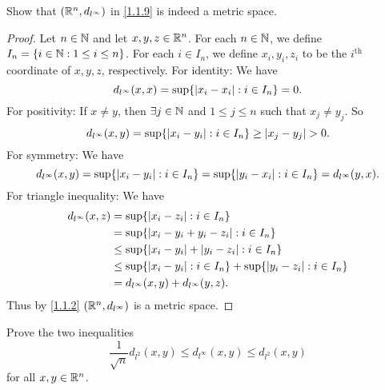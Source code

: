 \begin{ex}\label{ex:1.1.9}
  Show that \((\mathbb{R}^n, d_{l^\infty})\) in \cref{1.1.9} is indeed a metric space.
\end{ex}

\begin{proof}
  Let \(n \in \mathbb{N}\) and let \(x, y, z \in \mathbb{R}^n\).
  For each \(n \in \mathbb{N}\), we define \(I_n = \{i \in \mathbb{N} : 1 \leq i \leq n\}\).
  For each \(i \in I_n\), we define \(x_i, y_i, z_i\) to be the \(i^{\text{th}}\) coordinate of \(x, y, z\), respectively.
  For identity:
  We have
  \[
    d_{l^\infty}(x, x) = \sup \{\left\lvert x_i - x_i\right\rvert : i \in I_n\} = 0.
  \]
  For positivity:
  If \(x \neq y\), then \(\exists j \in \mathbb{N}\) and \(1 \leq j \leq n\) such that \(x_j \neq y_j\).
  So
  \[
    d_{l^\infty}(x, y) = \sup \{\left\lvert x_i - y_i\right\rvert : i \in I_n\} \geq \left\lvert x_j - y_j\right\rvert > 0.
  \]
  For symmetry:
  We have
  \[
    d_{l^\infty}(x, y) = \sup \{\left\lvert x_i - y_i\right\rvert : i \in I_n\} = \sup \{\left\lvert y_i - x_i\right\rvert : i \in I_n\} = d_{l^\infty}(y, x).
  \]
  For triangle inequality:
  We have
  \begin{align*}
    d_{l^\infty}(x, z) & = \sup \{\left\lvert x_i - z_i\right\rvert : i \in I_n\}                                           \\
                       & = \sup \{\left\lvert x_i - y_i + y_i - z_i\right\rvert : i \in I_n\}                               \\
                       & \leq \sup \{\left\lvert x_i - y_i\right\rvert + \left\lvert y_i - z_i\right\rvert : i \in I_n\}                      \\
                       & \leq \sup \{\left\lvert x_i - y_i\right\rvert : i \in I_n\} + \sup \{\left\lvert y_i - z_i\right\rvert : i \in I_n\} \\
                       & = d_{l^\infty}(x, y) + d_{l^\infty}(y, z).
  \end{align*}
  Thus by \cref{1.1.2} \((\mathbb{R}^n, d_{l^\infty})\) is a metric space.
\end{proof}

\begin{ex}\label{ex:1.1.10}
  Prove the two inequalities
  \[
    \dfrac{1}{\sqrt{n}} d_{l^2}(x, y) \leq d_{l^\infty}(x, y) \leq d_{l^2}(x, y)
  \]
  for all \(x, y \in \mathbb{R}^n\).
\end{ex}

